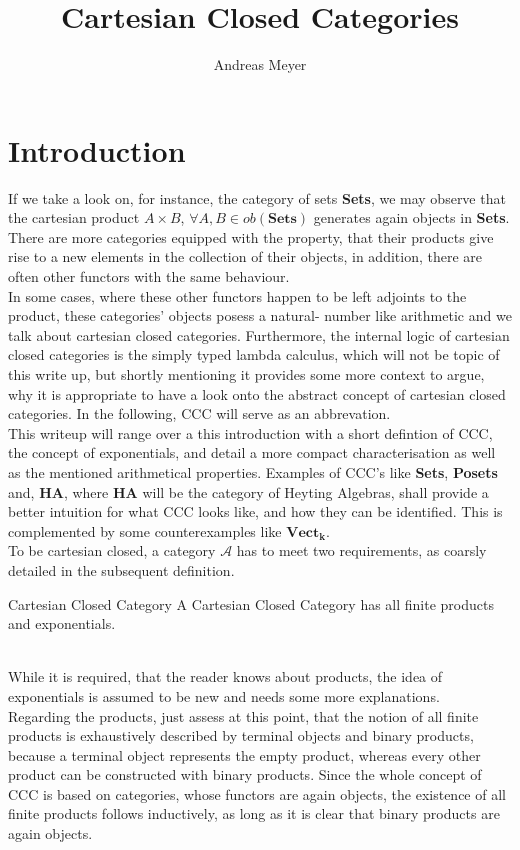 
\def\pathToRoot{../}



\title{Cartesian Closed Categories}
\author{Andreas Meyer}
\maketitle

\section{Introduction}
If we take a look on, for instance, the category of sets \textbf{Sets}, we may observe that the cartesian product $A \times B$, $\forall A, B \in ob(\textbf{Sets})$ generates again objects in \textbf{Sets}. There are more categories equipped with the property, that their products give rise to a new elements in the collection of their objects, in addition, there are often other functors with the same behaviour.
\\
In some cases, where these other functors happen to be left adjoints to the product, these categories' objects posess a natural- number like arithmetic and we talk about cartesian closed categories.
Furthermore, the internal logic of cartesian closed categories is the simply typed lambda calculus, which will not be topic of this write up, but shortly mentioning it provides some more context to argue, why  it is appropriate to have a look onto the abstract concept of cartesian closed categories.
In the following, CCC will serve as an abbrevation.
\\
This writeup will range over a this introduction with a short defintion of CCC, the concept of exponentials, and detail a more compact characterisation as well as the mentioned arithmetical properties.
Examples of CCC's like \textbf{Sets}, \textbf{Posets} and, \textbf{HA}, where \textbf{HA} will be the category of Heyting Algebras, shall provide a better intuition for what CCC looks like, and how they can be identified.
This is complemented by some counterexamples like  $\boldsymbol{Vect_k}$. 
\\


To be cartesian closed, a category $\mathcal{A}$ has to meet two requirements, as coarsly detailed in the subsequent definition.
\begin{definition}{Cartesian Closed Category}
  A Cartesian Closed Category has all finite products and exponentials.

\end{definition}
\\
While it is required, that the reader knows about products, the idea of exponentials is assumed to be new and needs some more explanations.
\\
Regarding the products, just assess at this point, that the notion of all finite products is exhaustively described by terminal objects and binary products, because a terminal object represents the empty product, whereas every other product can be constructed with binary products. Since the whole concept of CCC is based on categories, whose functors are again objects, the existence of all finite products follows inductively, as long as it is clear that binary products are again objects.

